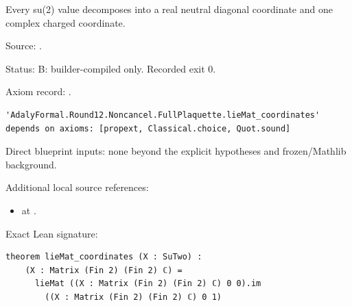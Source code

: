 \begin{theorem}[bp-206]
\label{bp-206}
\uses{}
\leanok
Every su(2) value decomposes into a real neutral diagonal coordinate and one complex charged coordinate.

\par Source: \texttt{}.
\par Status: B: builder-compiled only. Recorded exit 0.
\par Axiom record: \texttt{}.
\begin{verbatim}
'AdalyFormal.Round12.Noncancel.FullPlaquette.lieMat_coordinates' depends on axioms: [propext, Classical.choice, Quot.sound]
\end{verbatim}
\par Direct blueprint inputs: none beyond the explicit hypotheses and frozen/Mathlib background.
\par Additional local source references:
\begin{itemize}
\item \texttt{} at \texttt{}.
\end{itemize}
\par Exact Lean signature:
\begin{verbatim}
theorem lieMat_coordinates (X : SuTwo) :
    (X : Matrix (Fin 2) (Fin 2) ℂ) =
      lieMat ((X : Matrix (Fin 2) (Fin 2) ℂ) 0 0).im
        ((X : Matrix (Fin 2) (Fin 2) ℂ) 0 1)
\end{verbatim}
\end{theorem}

